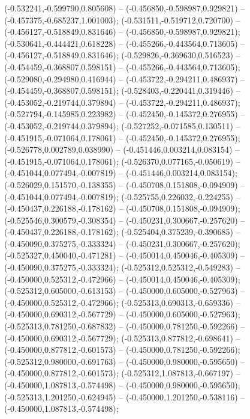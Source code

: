  (-0.532241,-0.599790,0.805608) -- (-0.456850,-0.598987,0.929821) -- (-0.457375,-0.685237,1.001003);
 (-0.531511,-0.519712,0.720700) -- (-0.456127,-0.518849,0.831646) -- (-0.456850,-0.598987,0.929821);
 (-0.530641,-0.444421,0.618228) -- (-0.455266,-0.443564,0.713605) -- (-0.456127,-0.518849,0.831646);
 (-0.529826,-0.369630,0.516523) -- (-0.454459,-0.368807,0.598151) -- (-0.455266,-0.443564,0.713605);
 (-0.529080,-0.294980,0.416944) -- (-0.453722,-0.294211,0.486937) -- (-0.454459,-0.368807,0.598151);
 (-0.528403,-0.220441,0.319446) -- (-0.453052,-0.219744,0.379894) -- (-0.453722,-0.294211,0.486937);
 (-0.527794,-0.145985,0.223982) -- (-0.452450,-0.145372,0.276955) -- (-0.453052,-0.219744,0.379894);
 (-0.527252,-0.071585,0.130511) -- (-0.451915,-0.071064,0.178061) -- (-0.452450,-0.145372,0.276955);
 (-0.526778,0.002789,0.038990) -- (-0.451446,0.003214,0.083154) -- (-0.451915,-0.071064,0.178061);
 (-0.526370,0.077165,-0.050619) -- (-0.451044,0.077494,-0.007819) -- (-0.451446,0.003214,0.083154);
 (-0.526029,0.151570,-0.138355) -- (-0.450708,0.151808,-0.094909) -- (-0.451044,0.077494,-0.007819);
 (-0.525755,0.226032,-0.224255) -- (-0.450437,0.226188,-0.178162) -- (-0.450708,0.151808,-0.094909);
 (-0.525546,0.300579,-0.308354) -- (-0.450231,0.300667,-0.257620) -- (-0.450437,0.226188,-0.178162);
 (-0.525404,0.375239,-0.390685) -- (-0.450090,0.375275,-0.333324) -- (-0.450231,0.300667,-0.257620);
 (-0.525327,0.450040,-0.471281) -- (-0.450014,0.450046,-0.405309) -- (-0.450090,0.375275,-0.333324);
 (-0.525312,0.525312,-0.549283) -- (-0.450000,0.525312,-0.472966) -- (-0.450014,0.450046,-0.405309);
 (-0.525312,0.605000,-0.613153) -- (-0.450000,0.605000,-0.527963) -- (-0.450000,0.525312,-0.472966);
 (-0.525313,0.690313,-0.659336) -- (-0.450000,0.690312,-0.567729) -- (-0.450000,0.605000,-0.527963);
 (-0.525313,0.781250,-0.687832) -- (-0.450000,0.781250,-0.592266) -- (-0.450000,0.690312,-0.567729);
 (-0.525313,0.877812,-0.698641) -- (-0.450000,0.877812,-0.601573) -- (-0.450000,0.781250,-0.592266);
 (-0.525312,0.980000,-0.691763) -- (-0.450000,0.980000,-0.595650) -- (-0.450000,0.877812,-0.601573);
 (-0.525312,1.087813,-0.667197) -- (-0.450000,1.087813,-0.574498) -- (-0.450000,0.980000,-0.595650);
 (-0.525313,1.201250,-0.624945) -- (-0.450000,1.201250,-0.538116) -- (-0.450000,1.087813,-0.574498);

